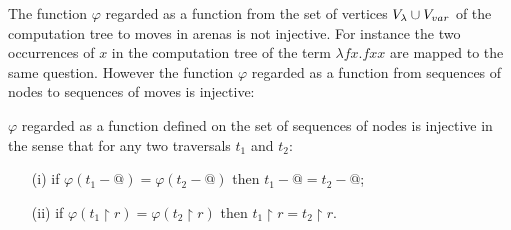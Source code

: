 The function $\varphi$ regarded as a function from the set of vertices $V_\lambda \cup V_{var}$ of the computation tree to moves in arenas is not injective.
For instance the two occurrences of $x$ in the computation tree of the term $\lambda f x. f x x$ are mapped to the same question. However
the function $\varphi$ regarded as a function from sequences of nodes to sequences of moves is injective:
\begin{lem}
\label{lem:varphiinjective}
$\varphi$ regarded as a function defined on the set of
sequences of nodes is injective in the sense that for any two traversals $t_1$ and $t_2$:
\begin{itemize}
\item[(i)] if $\varphi (t_1 - @ ) = \varphi (t_2 - @ )$ then $t_1-@ =t_2 -@$;
\item[(ii)] if $\varphi (t_1 \upharpoonright r ) = \varphi (t_2 \upharpoonright r )$ then $t_1\upharpoonright r = t_2\upharpoonright r$.
\end{itemize}
\end{lem}
